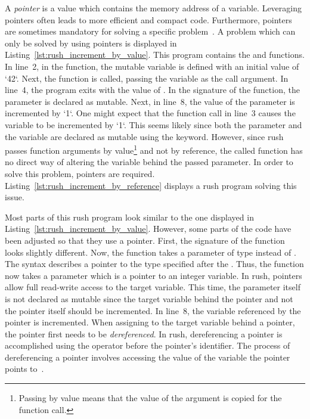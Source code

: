 
A \emph{pointer} is a value which contains the memory address of a variable.
Leveraging pointers often leads to more efficient and compact code.
Furthermore, pointers are sometimes mandatory for solving a specific problem~\cite[p.~93]{Ritchie1988}.
A problem which can only be solved by using pointers is displayed in Listing~\ref{lst:rush_increment_by_value}.
This program contains the  and  functions.
In line~2, in the  function, the mutable variable  is defined with an initial value of `42`.
Next, the  function is called, passing the variable as the call argument.
In line~4, the program exits with the value of .
In the signature of the  function, the  parameter is declared as mutable.
Next, in line~8, the value of the parameter is incremented by `1`.
One might expect that the function call in line~3 causes the variable  to be incremented by `1`.
This seems likely since both the parameter and the variable are declared as mutable using the  keyword.
However, since rush passes function arguments by value\footnote{Passing by value means that the value of the argument is copied for the function call.} and not by reference, the called function has no direct way of altering the variable behind the passed parameter.
In order to solve this problem, pointers are required.
Listing~\ref{lst:rush_increment_by_reference} displays a rush program solving this issue.


Most parts of this rush program look similar to the one displayed in Listing~\ref{lst:rush_increment_by_value}.
However, some parts of the code have been adjusted so that they use a pointer.
First, the signature of the  function looks slightly different.
Now, the function takes a parameter of type  instead of .
The syntax  describes a pointer to the type specified after the \qVerb{*}.
Thus, the function now takes a parameter which is a pointer to an integer variable.
In rush, pointers allow full read-write access to the target variable.
This time, the parameter itself is not declared as mutable since the target variable behind the pointer and not the pointer itself should be incremented.
In line~8, the variable referenced by the pointer is incremented.
When assigning to the target variable behind a pointer, the pointer first needs to be \emph{dereferenced}.
In rush, dereferencing a pointer is accomplished using the \qVerb{*} operator before the pointer's identifier.
The process of dereferencing a pointer involves accessing the value of the variable the pointer points to~\cite[p.~94]{Ritchie1988}.

